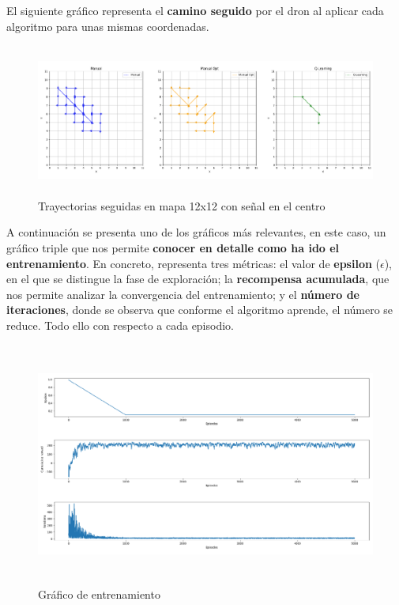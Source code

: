 El siguiente gráfico representa el \textbf{camino seguido} por el dron al aplicar cada algoritmo para unas mismas coordenadas.\\

\begin{figure} [H]
    \begin{center}
    \includegraphics[height=5cm]{imagenes/cap4/13_trayectorias_12.png}
    \end{center}
    \caption[Trayectorias seguidas en mapa 12x12 con señal en el centro]{Trayectorias seguidas en mapa 12x12 con señal en el centro}
    \label{fig:12_traj}
\end{figure}

A continuación se presenta uno de los gráficos más relevantes, en este caso, un gráfico triple que nos permite \textbf{conocer en detalle como ha ido el entrenamiento}. En concreto, representa tres métricas: el valor de \textbf{epsilon} ($\epsilon$), en el que se distingue la fase de exploración; la \textbf{recompensa acumulada}, que nos permite analizar la convergencia del entrenamiento; y el \textbf{número de iteraciones}, donde se observa que conforme el algoritmo aprende, el número se reduce. Todo ello con respecto a cada episodio.\\

\begin{figure} [H]
    \begin{center}
    \includegraphics[height=8cm]{imagenes/cap4/14_training_graph.png}
    \end{center}
    \caption[Gráfico de entrenamiento]{Gráfico de entrenamiento}
    \label{fig:training_graph}
\end{figure}

